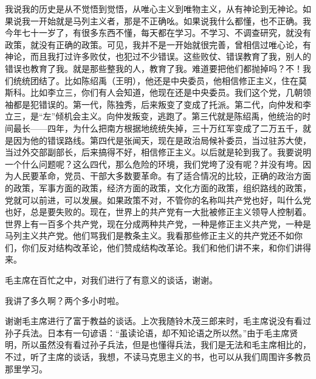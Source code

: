 我说我的历史是从不觉悟到觉悟，从唯心主义到唯物主义，从有神论到无神论。如果说我一开始就是马列主义者，那是不正确吆。如果说我什么都懂，也不正确。我今年七十一岁了，有很多东西不懂，每天都在学习。不学习、不调查研究，就没有政策，就没有正确的政策。可见，我并不是一开始就很完善，曾相信过唯心论，有神论，而且我打过许多败仗，也犯过不少错误。这些败仗、错误教育了我，别人的错误也教育了我。就是那些整我的人，教育了我。难道要把他们都抛掉吗？不！我们统统团结了。比如陈绍禹（王明），他还是中央委员，他相信修正主义，住在莫斯科。比如李立三，你们有人会知道，他现在还是中央委员。我们这个党，几朝领袖都是犯错误的。第一代，陈独秀，后来叛变了变成了托派。第二代，向仲发和李立三，是“左”倾机会主义。向仲发叛变，逃跑了。第三代就是陈绍禹，他统治的时间最长——四年，为什么把南方根据地统统失掉，三十万红军变成了二万五千，就是因为他的错误路线。第四代是张闻天，现在是政治局候补委员，当过驻苏大使，当过外交部副部长，后来搞得不好，相信修正主义。以后就是轮到我了。我要说明一个什么问题呢？这么四代，那么危险的环境，我们党垮了没有呢？并没有垮。因为人民要革命，党员、干部大多数要革命。有了适合情况的比较，正确的政治方面的政策，军事方面的政策，经济方面的政策，文化方面的政策，组织路线的政策，党就可以前进，可以发展。如果政策不对，不管你的名称叫共产党也好，叫什么党也好，总是要失败的。现在，世界上的共产党有一大批被修正主义领导人控制着。世界上有一百多个共产党，现在分成两种共产党，一种是修正主义共产党，一种是马列主义共产党。他们骂我们是教条主义。我看那些修正主义的共产党还不如你们，你们反对结构改革论，他们赞成结构改革论。我们和他们讲不来，和你们讲得来。

毛主席在百忙之中，对我们进行了有意义的谈话，谢谢。

我讲了多久啊？两个多小时啦。

谢谢毛主席进行了富于教益的谈话。上次我随铃木茂三郎来时，毛主席说没有看过孙子兵法。日本有一句谚语：“虽读论语，却不知论语之所以然。”由于毛主席贤明，所以虽然没有看过孙子兵法，但是也懂得兵法，我们是无法和毛主席相比的，不过，听了主席的谈话，我想，不读马克思主义的书，也可以从我们周围许多教员那里学习。

